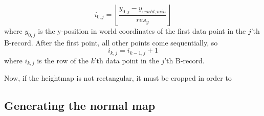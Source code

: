 $$
i_{0,j} = \left\lfloor \frac{y_{0,j}-y_{world,min}}{res_y}\right\rfloor
$$
where $y_{0,j}$ is the y-position in world coordinates of the first data point in the $j$'th B-record. After the first point, all other points come sequentially, so
$$
i_{k,j} = i_{k-1,j} + 1
$$
where $i_{k,j}$ is the row of the $k$'th data point in the $j$'th B-record.

Now, if the heightmap is not rectangular, it must be cropped in order to 




\subsection{Generating the normal map}


